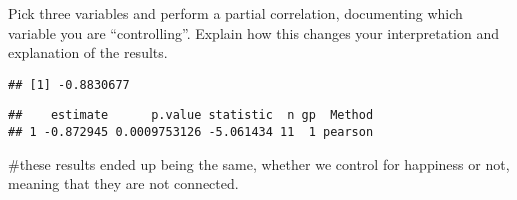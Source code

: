 \documentclass[
]{article}
\newenvironment{Shaded}{\begin{snugshade}}{\end{snugshade}}
\newcommand{\FunctionTok}[1]{\textcolor[rgb]{0.00,0.00,0.00}{#1}}
\newcommand{\NormalTok}[1]{#1}
\newcommand{\SpecialCharTok}[1]{\textcolor[rgb]{0.00,0.00,0.00}{#1}}
\begin{document}
Pick three variables and perform a partial correlation, documenting
which variable you are ``controlling''. Explain how this changes your
interpretation and explanation of the results.

\begin{Shaded}
\end{Shaded}

\begin{verbatim}
## [1] -0.8830677
\end{verbatim}

\begin{Shaded}
\end{Shaded}

\begin{verbatim}
##    estimate      p.value statistic  n gp  Method
## 1 -0.872945 0.0009753126 -5.061434 11  1 pearson
\end{verbatim}

\#these results ended up being the same, whether we control for
happiness or not, meaning that they are not connected.
\end{document}

